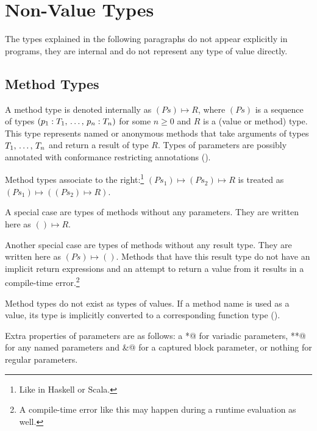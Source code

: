 \section{Non-Value Types}

The types explained in the following paragraphs do not appear explicitly in programs, they are internal and do not represent any type of value directly. 






\subsection{Method Types}
\label{sec:method-types}

A method type is denoted internally as $(Ps) \mapsto R$, where $(Ps)$ is a sequence of types  $(p_1 : T_1 ,\, \ldots ,\, p_n : T_n)$ for some $n \geq 0$ and $R$ is a (value or method) type. This type represents named or anonymous methods that take arguments of types $T_1 ,\, \ldots ,\, T_n$ and return a result of type $R$. Types of parameters are possibly annotated with conformance restricting annotations (). 

Method types associate to the right:\footnote{Like in Haskell or Scala.} \newline
$(Ps_1) \mapsto (Ps_2) \mapsto R$ is treated as $(Ps_1) \mapsto ((Ps_2) \mapsto R)$. 

A special case are types of methods without any parameters. They are written here as $() \mapsto R$. 

Another special case are types of methods without any result type. They are written here as $(Ps) \mapsto ()$. Methods that have this result type do not have an implicit return expressions and an attempt to return a value from it results in a compile-time error.\footnote{A compile-time error like this may happen during a runtime evaluation as well.}

Method types do not exist as types of values. If a method name is used as a value, its type is implicitly converted to a corresponding function type (). 

Extra properties of parameters are as follows: a \lstinline@*@ for variadic parameters, \lstinline@**@ for any named parameters and \lstinline@&@ for a captured block parameter, or nothing for regular parameters. 

